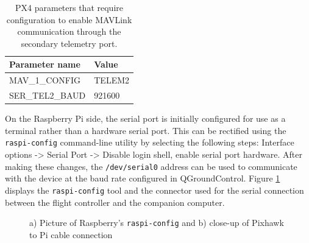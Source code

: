 \begin{table}[h!]
 \begin{center}
  \begin{tabular}{l|l}
    Parameter name & Value \\ \hline
    MAV\_1\_CONFIG & TELEM2 \\
    SER\_TEL2\_BAUD & 921600 \\
  \end{tabular}
  \caption{PX4 parameters that require configuration to enable MAVLink communication through the secondary telemetry port.}
  \label{tab:telem2-params}
 \end{center}
\end{table}


On the Raspberry Pi side, the serial port is initially configured for use as a terminal rather than a hardware serial port. This can be rectified using the \texttt{raspi-config} command-line utility by selecting the following steps: Interface options -> Serial Port -> Disable login shell, enable serial port hardware. After making these changes, the \texttt{/dev/serial0} address can be used to communicate with the device at the baud rate configured in QGroundControl. Figure \ref{fig:serial-connection} displays the \texttt{raspi-config} tool and the connector used for the serial connection between the flight controller and the companion computer.


\begin{figure}
  \centering
  \caption{a) Picture of Raspberry's \texttt{raspi-config} and b) close-up of Pixhawk to Pi cable connection}
  \label{fig:serial-connection}
\end{figure}



